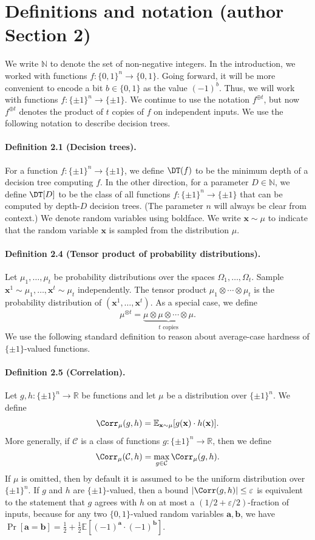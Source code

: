 \section*{Definitions and notation (author Section 2)}
We write $\mathbb N$ to denote the set of non-negative integers.
In the introduction, we worked with functions $f:\{0,1\}^n\to\{0,1\}$. Going forward, it will be more convenient to encode a bit $b\in\{0,1\}$ as the value $(-1)^b$. Thus, we will work with functions $f:\{\pm1\}^n\to\{\pm1\}$. We continue to use the notation $f^{\oplus t}$, but now $f^{\oplus t}$ denotes the product of $t$ copies of $f$ on independent inputs.
We use the following notation to describe decision trees.
\paragraph{Definition 2.1 (Decision trees).} For a function $f:\{\pm1\}^n\to\{\pm1\}$, we define $\DT(f)$ to be the minimum depth of a decision tree computing $f$. In the other direction, for a parameter $D\in\mathbb N$, we define $\DT[D]$ to be the class of all functions $f:\{\pm1\}^n\to\{\pm1\}$ that can be computed by depth-$D$ decision trees. (The parameter $n$ will always be clear from context.)
We denote random variables using boldface. We write $\mathbf x\sim\mu$ to indicate that the random variable $\mathbf x$ is sampled from the distribution $\mu$.
\paragraph{Definition 2.4 (Tensor product of probability distributions).} Let $\mu_1,\ldots,\mu_t$ be probability distributions over the spaces $\Omega_1,\ldots,\Omega_t$. Sample $\mathbf x^1\sim\mu_1,\ldots,\mathbf x^t\sim\mu_t$ independently. The tensor product $\mu_1\otimes\cdots\otimes\mu_t$ is the probability distribution of $(\mathbf x^1,\ldots,\mathbf x^t)$. As a special case, we define
\[\mu^{\otimes t}=\underbrace{\mu\otimes\mu\otimes\cdots\otimes\mu}_{t\text{ copies}}.\]
We use the following standard definition to reason about average-case hardness of $\{\pm1\}$-valued functions.
\paragraph{Definition 2.5 (Correlation).} Let $g,h:\{\pm1\}^n\to\mathbb R$ be functions and let $\mu$ be a distribution over $\{\pm1\}^n$. We define
\[\Corr_\mu(g,h)=\mathbb E_{\mathbf x\sim\mu}[g(\mathbf x)\cdot h(\mathbf x)].\]
More generally, if $\mathcal C$ is a class of functions $g:\{\pm1\}^n\to\mathbb R$, then we define
\[\Corr_\mu(\mathcal C,h)=\max_{g\in\mathcal C}\Corr_\mu(g,h).\]
If $\mu$ is omitted, then by default it is assumed to be the uniform distribution over $\{\pm1\}^n$.
If $g$ and $h$ are $\{\pm1\}$-valued, then a bound $|\Corr(g,h)|\le\varepsilon$ is equivalent to the statement that $g$ agrees with $h$ on at most a $(1/2+\varepsilon/2)$-fraction of inputs, because for any two $\{0,1\}$-valued random variables $\mathbf a,\mathbf b$, we have $\Pr[\mathbf a=\mathbf b]=\frac12+\frac12\mathbb E[(-1)^{\mathbf a}\cdot(-1)^{\mathbf b}]$.
